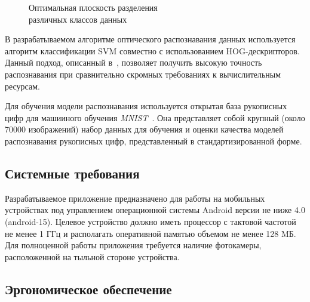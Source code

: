 \begin{figure}[h!]
  \centering
  \caption{Оптимальная плоскость разделения \\ различных классов данных}
  \label{fig:design_algorithm_svm}
\end{figure}

В разрабатываемом алгоритме оптического распознавания данных
используется алгоритм классификации SVM совместно с
использованием HOG-дескрипторов.
Данный подход, описанный в~\cite{ebrahimzadeh14},
позволяет получить высокую точность распознавания при
сравнительно скромных требованиях к вычислительным ресурсам.

Для обучения модели распознавания используется открытая база рукописных
цифр для машииного обучения \textit{MNIST}~\cite{mnist}.
Она представляет собой крупный (около 70000 изображений) набор данных
для обучения и оценки качества моделей распознавания рукописных цифр,
представленный в стандартизированной форме.

\subsection{Системные требования}

Разрабатываемое приложение предназначено для работы на мобильных устройствах
под управлением операционной системы Android версии не ниже 4.0 (android-15).
Целевое устройство должно иметь процессор с тактовой частотой не менее
1 ГГц и располагать оперативной памятью объемом не менее 128 MБ.
Для полноценной работы приложения требуется наличие фотокамеры,
расположенной на тыльной стороне устройства.

\subsection{Эргономическое обеспечение}

